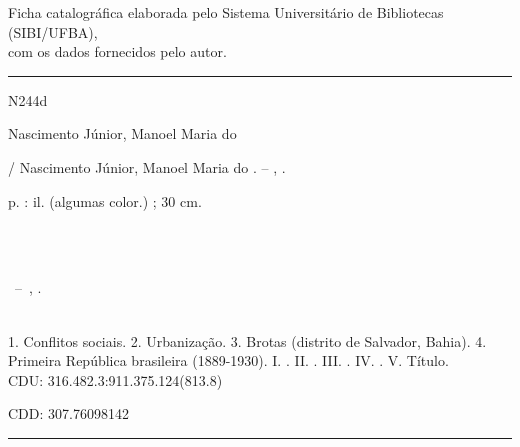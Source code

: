
%
%     
\begin{fichacatalografica}
	\vspace*{\fill}					%
\centering Ficha catalográfica elaborada pelo Sistema Universitário de Bibliotecas (SIBI/UFBA), \\ com os dados fornecidos pelo autor.

	\hrule							%
N244d \hspace*{\fill}
	\begin{center}					%
	\begin{minipage}[c]{12.5cm}		%
	
	Nascimento Júnior, Manoel Maria do %
	
	\hspace{0.5cm} \imprimirtitulo  / Nascimento Júnior, Manoel Maria do %
	. -- \imprimirlocal, \imprimirdata .
	
	\hspace{0.5cm} \pageref{LastPage} p. : il. (algumas color.) ; 30 cm.\\
	
	\hspace{0.5cm} \imprimirorientadoraRotulo~\imprimirorientadora
	
	\hspace{0.5cm} \imprimircoorientadoraRotulo~\imprimircoorientadora\\
	
	\hspace{0.5cm}
	\parbox[t]{\textwidth}{\imprimirtipotrabalho~--~\imprimirinstituicao,
	\imprimirdata.}\\
	
	\hspace{0.5cm}
		1. Conflitos sociais.
		2. Urbanização.
		3. Brotas (distrito de Salvador, Bahia).
		4. Primeira República brasileira (1889-1930).
		I. \imprimirorientadora.
		II. \imprimircoorientadora.
		III. \imprimirinstituicao.
		IV. \imprimirfaculdade.
		V. Título.\\ 			
	
	\hspace{7cm} CDU: 316.482.3:911.375.124(813.8)

	\hspace{7cm} CDD: 307.76098142
	
	\end{minipage}
	\end{center}
	\hrule
\end{fichacatalografica}

